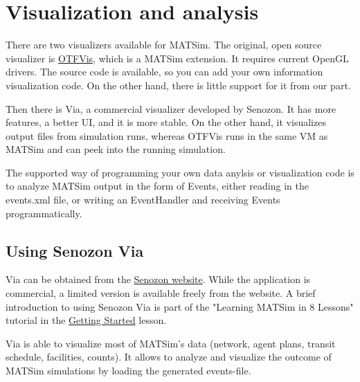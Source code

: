 \chapter{Visualization and analysis}

There are two visualizers available for MATSim. The original, open source visualizer is \href{http://matsim.org/docs/extensions/otfvis}{OTFVis},  which is a MATSim extension. It requires current OpenGL drivers. The  source code is available, so you can add your own information  visualization code. On the other hand, there is little support for it  from our part.

Then there is Via, a commercial visualizer developed by Senozon. It  has more features, a better UI, and it is more stable. On the other hand, it visualizes output files from simulation runs, whereas OTFVis runs in the same VM as MATSim and can peek into the running simulation.

The supported way of programming your own data anylsis or visualization code is to analyze MATSim output in the form of Events, either reading in the events.xml file, or writing an EventHandler and  receiving Events programmatically.

\vfill\eject
\section{Using Senozon Via}

Via can be obtained from the \href{http://senozon.com/products/via}{Senozon website}. While the application is commercial, a limited version
is available freely from the website. 
A brief introduction to using Senozon Via is part of the "Learning MATSim in 8 Lessons" tutorial in the \href{http://www.matsim.org/docs/tutorials/8lessons/getting-started}{Getting Started} lesson.

Via is able to visualize most of MATSim's data (network, agent plans, transit schedule, facilities, counts).
It allows to analyze and visualize the outcome of MATSim simulations by loading the generated events-file.



